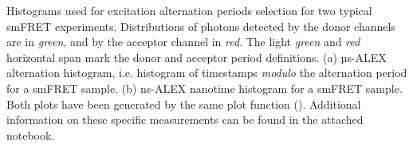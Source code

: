 \label{fig:altern_hist_double}
Histograms used for excitation alternation periods selection for two typical smFRET experiments. 
Distributions of photons detected by the donor channels are in \textit{green}, and by the acceptor channel in \textit{red}.
The light \textit{green} and \textit{red} horizontal span mark the donor and acceptor period definitions.
(a) µs-ALEX alternation histogram, i.e. histogram of timestamps \textit{modulo} the alternation period for a smFRET sample. 
(b) ns-ALEX nanotime histogram for a smFRET sample. Both plots have been generated by the same plot function (). 
Additional information on these specific measurements can be found in the  attached notebook.